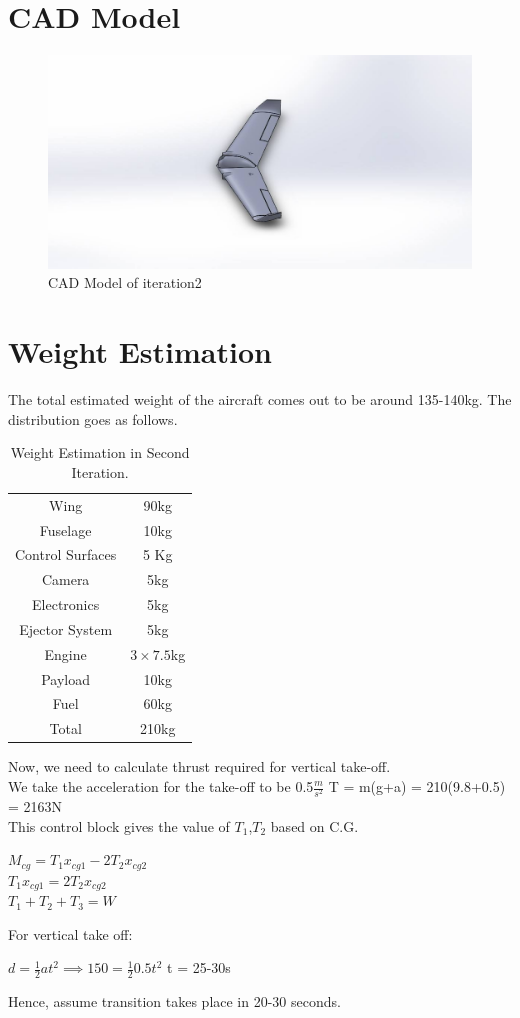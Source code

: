 \section{CAD Model}
\begin{figure}[H]
\centering
\includegraphics[width = \textwidth]{iter2.jpg}
\caption{CAD Model of iteration2}
\end{figure}

\section{Weight Estimation}
The total estimated weight of the aircraft comes out to be around 135-140kg. The distribution goes as follows.\\
\begin{table}[H]
\begin{center}
\begin{tabular}{ |c| c| }
\hline
 Wing & 90kg \\ 
 Fuselage & 10kg \\ 
 Control Surfaces & 5 Kg \\ 
 Camera & 5kg \\
 Electronics & 5kg \\
 Ejector System & 5kg \\
 Engine & $3\times7.5$kg \\
 Payload & 10kg \\
 Fuel & 60kg \\
 \hline
 Total & 210kg \\
\hline
\end{tabular}
\end{center}
\caption{Weight Estimation in Second Iteration.}
\label{Table2}
\end{table}
Now, we need to calculate thrust required for vertical take-off. \\
We take the acceleration for the take-off to be 0.5$\frac{m}{s^2}$
T = m(g+a) = 210(9.8+0.5) = 2163N \\
This control block gives the value of $T_1$,$T_2$ based on C.G.
\begin{center}
$M_{cg} = T_1x_{cg1} - 2T_2x_{cg2}$ \\
$T_1x_{cg1} = 2T_2x_{cg2}$ \\
$T_1 + T_2 + T_3 = W$ \\
\end{center}
For vertical take off:
\begin{center}
$d = \frac{1}{2}at^2 \implies 150 = \frac{1}{2}0.5t^2$
t = 25-30s
\end{center}
Hence, assume transition takes place in 20-30 seconds. 

